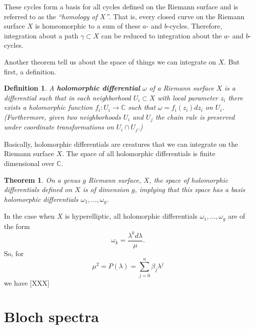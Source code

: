 \documentclass[12pt, a4paper]{article}
\newcommand{\CC}{\mathbb{C}}
\newtheorem{theorem}{Theorem}
\newtheorem{definition}{Definition}
\begin{document}
These cycles form a basis for all cycles defined on the Riemann surface
and is referred to as the {\it ``homology of $X$''}. That is, every
closed curve on the Riemann surface $X$ is homeomorphic to a sum of
these $a$- and $b$-cycles. Therefore, integration about a path $\gamma
\subset X$ can be reduced to integration about the $a$- and $b$-cycles.

Another theorem tell us about the space of things we can integrate on
$X$. But first, a definition. \\

\begin{definition}
  A {\bf holomorphic differential} $\omega$ of a Riemann surface $X$ is
  a differential such that in each neighborhood $U_i \subset X$ with
  local parameter $z_i$ there exists a holomorphic function $f_i : U_i
  \to \mathbb{C}$ such that $\omega = f_i(z_i)dz_i$ on
  $U_i$. (Furthermore, given two neighborhoods $U_i$ and $U_j$ the chain
  rule is preserved under coordinate transformations on $U_i \cap U_j$.)
\end{definition}

Basically, holomorphic differentials are creatures that we can integrate
on the Riemann surface $X$. The space of all holomorphic differentials
is finite dimensional over $\CC$.

\begin{theorem}
  On a genus $g$ Riemann surface, $X$, the space of holomorphic
  differentials defined on $X$ is of dimension $g$, implying that this
  space has a basis holomorphic differentials $\omega_1, \ldots,
  \omega_g$.
\end{theorem}

In the case when $X$ is hyperelliptic, all holomorphic differentials
$\omega_1, \ldots, \omega_g$ are of the form
\begin{equation} \label{eqn: holom}
  \omega_k =  \frac{\lambda^k d \lambda}{\mu}.
\end{equation}
So, for
\begin{equation*}
  \mu^2 = P(\lambda) = \sum_{j=0}^n \beta_j \lambda^j
\end{equation*}
we have [XXX]



\section{Bloch spectra}
\end{document}
